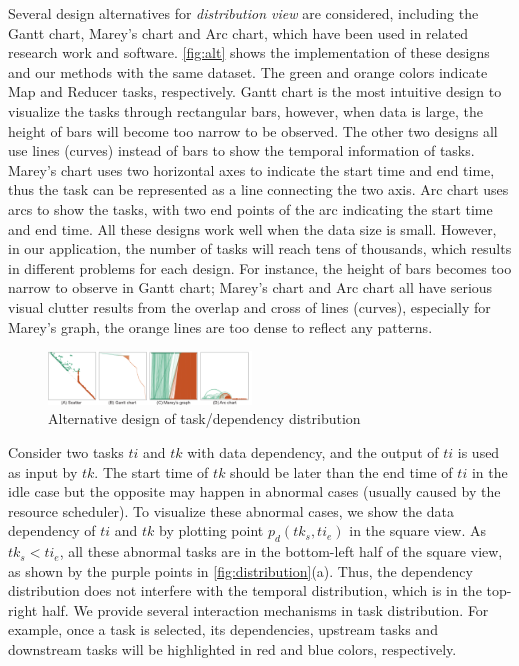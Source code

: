 Several design alternatives for \textit{distribution view} are considered, including the Gantt chart, Marey's chart and Arc chart, which have been used in related research work and software. 
\autoref{fig:alt} shows the implementation of these designs and our methods with the same dataset. The green and orange colors indicate Map and Reducer tasks, respectively. 
Gantt chart is the most intuitive design to visualize the tasks through rectangular bars, however, when data is large, the height of bars will become too narrow to be observed. The other two designs all use lines (curves) instead of bars to show the temporal information of tasks. Marey's chart uses two horizontal axes to indicate the start time and end time, thus the task can be represented as a line connecting the two axis. Arc chart uses arcs to show the tasks, with two end points of the arc indicating the start time and end time. 
All these designs work well when the data size is small. However, in our application, the number of tasks will reach tens of thousands, which results in different problems for each design. For instance, the height of bars becomes too narrow to observe in  Gantt chart; Marey's chart and Arc chart all have serious visual clutter results from the overlap and cross of lines (curves), especially for Marey's graph, the orange lines are too dense to reflect any patterns. 

\begin{figure}[t]
	\centering
	\includegraphics[width=0.48\textwidth]{figures/visualization/alternative_design.pdf}
	\vspace{-3mm}
	\caption{Alternative design of task/dependency distribution}
	\label{fig:alt}
	\vspace{-8mm}
\end{figure}


Consider two tasks $ti$ and $tk$ with data dependency, and the output of $ti$ is used as input by $tk$.
The start time of $tk$ should be later than the end time of $ti$ in the idle case but the opposite may happen in abnormal cases (usually caused by the resource scheduler).
To visualize these abnormal cases, 
we show the data dependency of $ti$ and $tk$ by plotting point $p_d(tk_s, ti_e)$ in the square view. 
As $tk_s<ti_e$, all these abnormal tasks are in the bottom-left half of the square view, as shown by the purple points in \autoref{fig:distribution}(a). Thus, the dependency distribution does not interfere with the temporal distribution, which is in the top-right half.     
We provide several interaction mechanisms in task distribution. For example, once a task is selected, its dependencies, upstream tasks and downstream tasks will be highlighted in red and blue colors, respectively. 


